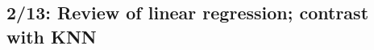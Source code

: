 \documentclass[titlepage,10pt]{scrartcl}
\begin{document}
\subsection*{2/13: Review of linear regression; contrast with KNN}

\end{document}
